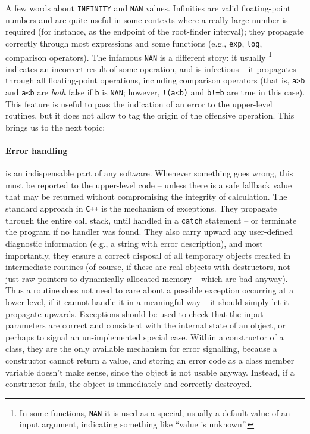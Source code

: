 \documentclass[12pt]{article}
\newcommand{\Cpp}  {\texttt{C++}\xspace}
\begin{document}
A few words about \texttt{INFINITY} and \texttt{NAN} values. Infinities are valid floating-point numbers and are quite useful in some contexts where a really large number is required (for instance, as the endpoint of the root-finder interval); they propagate correctly through most expressions and some functions (e.g., \texttt{exp}, \texttt{log}, comparison operators). The infamous \texttt{NAN} is a different story: it usually%
\footnote{In some functions, \texttt{NAN} it is used as a special, usually a default value of an input argument, indicating something like ``value is unknown''.}
indicates an incorrect result of some operation, and is infectious -- it propagates through all floating-point operations, including comparison operators (that is, \texttt{a>b} and \texttt{a<b} are \textit{both} false if \texttt{b} is \texttt{NAN}; however, \texttt{!(a<b)} and \texttt{b!=b} are true in this case). This feature is useful to pass the indication of an error to the upper-level routines, but it does not allow to tag the origin of the offensive operation. This brings us to the next topic:

\paragraph{Error handling} \label{sec:Exceptions}  is an indispensable part of any software. Whenever something goes wrong, this must be reported to the upper-level code -- unless there is a safe fallback value that may be returned without compromising the integrity of calculation. The standard approach in \Cpp is the mechanism of exceptions. They propagate through the entire call stack, until handled in a \texttt{catch} statement -- or terminate the program if no handler was found. They also carry upward any user-defined diagnostic information (e.g., a string with error description), and most importantly, they ensure a correct disposal of all temporary objects created in intermediate routines (of course, if these are real objects with destructors, not just raw pointers to dynamically-allocated memory -- which are bad anyway). 
Thus a routine does not need to care about a possible exception occurring at a lower level, if it cannot handle it in a meaningful way -- it should simply let it propagate upwards. Exceptions should be used to check that the input parameters are correct and consistent with the internal state of an object, or perhaps to signal an un-implemented special case. Within a constructor of a class, they are the only available mechanism for error signalling, because a constructor cannot return a value, and storing an error code as a class member variable doesn't make sense, since the object is not usable anyway. Instead, if a constructor fails, the object is immediately and correctly destroyed.
\end{document}
